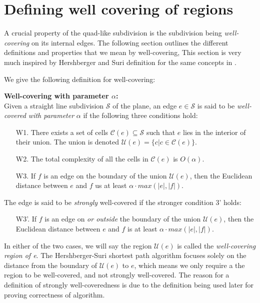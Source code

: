 \section{Defining well covering of regions}\label{section:def-well-covering-if-regions}

A crucial property of the quad-like subdivision is the subdivision being \textit{well-
covering} on its internal edges. The following section outlines the different definitions 
and properties that we mean by well-covering, This section is very much inspired by 
Hershberger and Suri definition for the same concepts in \cite{HershbergerS99}. 

We give the following definition for well-covering:

\begin{mydef}
	\label{def:wellcoveringwithpara}
	\textbf{Well-covering with parameter $\alpha$:}\\
	Given a straight line subdivision $\mathcal{S}$ of the plane, an edge
	$e\in\mathcal{S}$ is said to be \textit{well-covered with parameter}
	$\alpha$ if the following three conditions hold:
	\begin{enumerate}
    \setlength\itemsep{1em}
		\item[W1.] There exists a set of cells $\mathcal{C}(e)\subseteq\mathcal{S}$ such
				   that $e$ lies in the interior of their union. The union is denoted
				   $\mathcal{U}(e)=\{c|c\in\mathcal{C}(e)\}$.
		\item[W2.] The total complexity of all the cells in $\mathcal{C}(e)$ is 
        		   $O(\alpha)$.
		\item[W3.] If $f$ is an edge on the boundary of the union $\mathcal{U}(e)$, then
        		   the Euclidean distance between $e$ and $f$ us at least $\alpha\cdot
				   max(|e|,|f|)$. 
	\end{enumerate}
	The edge is said to be \textit{strongly} well-covered if the stronger
	condition 3' holds:
	\begin{enumerate}
    \setlength\itemsep{1em}
		\item[W3'.] If $f$ is an edge on \textit{or outside} the boundary of the
					union $\mathcal{U}(e)$, then the Euclidean distance between $e$ and
					$f$ is at least $\alpha\cdot max(|e|,|f|)$.
	\end{enumerate}
\end{mydef}

In either of the two cases, we will say the region $\mathcal{U}(e)$ is called
the \textit{well-covering region of e}. The Hershberger-Suri shortest path algorithm 
focuses solely on the distance from the boundary of $\mathcal{U}(e)$ to $e$, which means 
we only require a the region to be well-covered, and not strongly well-covered. The 
reason for a definition of strongly well-coveredness is due to the definition being 
used later for proving correctness of algorithm.

